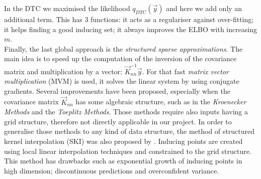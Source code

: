 In the DTC we maximised the likelihood $q_{DTC}(\vec{y})$ and here we add only an additional term. This has 3 functions: it acts as a regulariser against over-fitting; it helps finding a good inducing set; it always improves the ELBO with increasing $m$.  \\

Finally, the last global approach is the \textit{structured sparse approximations}. The main idea is to speed up the computation of the inversion of the covariance matrix and multiplication by a vector: $\vec{K}_{nn}^{-1}\vec{y}$. For that fast \textit{matrix vector multiplication} (MVM) is used, it solves the linear system by using conjugate gradients. Several improvements have been proposed, especially when the covariance matrix $\vec{K}_{nn}$ has some algebraic structure, such as in the \textit{Kroenecker Methods} and the \textit{Toeplitz Methods}. Those methods require also inputs having a grid structure, therefore not directly applicable in our project.  In order to generalise those methods to any kind of data structure, the method of structured kernel interpolation (SKI) was also proposed by \citet{wilson_kernel_2015}. Inducing points are created using local linear interpolation techniques and constrained to the grid structure. This method has drawbacks such as exponential growth of inducing points in high dimension; discontinuous predictions and overconfident variance. 


